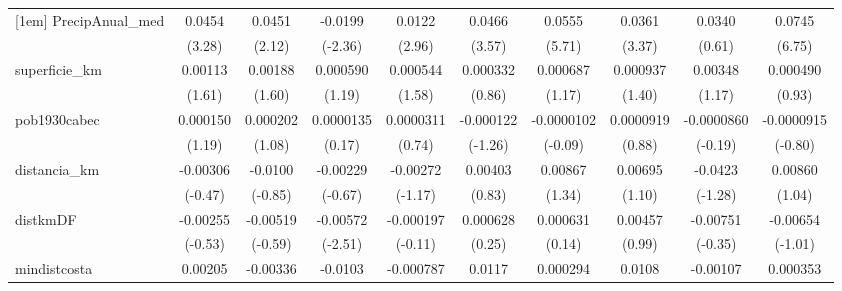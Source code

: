 {\begin{tabular}{l*{9}{c}}
[1em]
PrecipAnual\_med&      0.0454\sym{**} &      0.0451\sym{*}  &     -0.0199\sym{*}  &      0.0122\sym{**} &      0.0466\sym{***}&      0.0555\sym{***}&      0.0361\sym{***}&      0.0340         &      0.0745\sym{***}\\
            &      (3.28)         &      (2.12)         &     (-2.36)         &      (2.96)         &      (3.57)         &      (5.71)         &      (3.37)         &      (0.61)         &      (6.75)         \\
[1em]
superficie\_km&     0.00113         &     0.00188         &    0.000590         &    0.000544         &    0.000332         &    0.000687         &    0.000937         &     0.00348         &    0.000490         \\
            &      (1.61)         &      (1.60)         &      (1.19)         &      (1.58)         &      (0.86)         &      (1.17)         &      (1.40)         &      (1.17)         &      (0.93)         \\
[1em]
pob1930cabec&    0.000150         &    0.000202         &   0.0000135         &   0.0000311         &   -0.000122         &  -0.0000102         &   0.0000919         &  -0.0000860         &  -0.0000915         \\
            &      (1.19)         &      (1.08)         &      (0.17)         &      (0.74)         &     (-1.26)         &     (-0.09)         &      (0.88)         &     (-0.19)         &     (-0.80)         \\
[1em]
distancia\_km&    -0.00306         &     -0.0100         &    -0.00229         &    -0.00272         &     0.00403         &     0.00867         &     0.00695         &     -0.0423         &     0.00860         \\
            &     (-0.47)         &     (-0.85)         &     (-0.67)         &     (-1.17)         &      (0.83)         &      (1.34)         &      (1.10)         &     (-1.28)         &      (1.04)         \\
[1em]
distkmDF    &    -0.00255         &    -0.00519         &    -0.00572\sym{*}  &   -0.000197         &    0.000628         &    0.000631         &     0.00457         &    -0.00751         &    -0.00654         \\
            &     (-0.53)         &     (-0.59)         &     (-2.51)         &     (-0.11)         &      (0.25)         &      (0.14)         &      (0.99)         &     (-0.35)         &     (-1.01)         \\
[1em]
mindistcosta&     0.00205         &    -0.00336         &     -0.0103\sym{*}  &   -0.000787         &      0.0117\sym{***}&    0.000294         &      0.0108\sym{*}  &    -0.00107         &    0.000353         \\

\end{tabular}}
